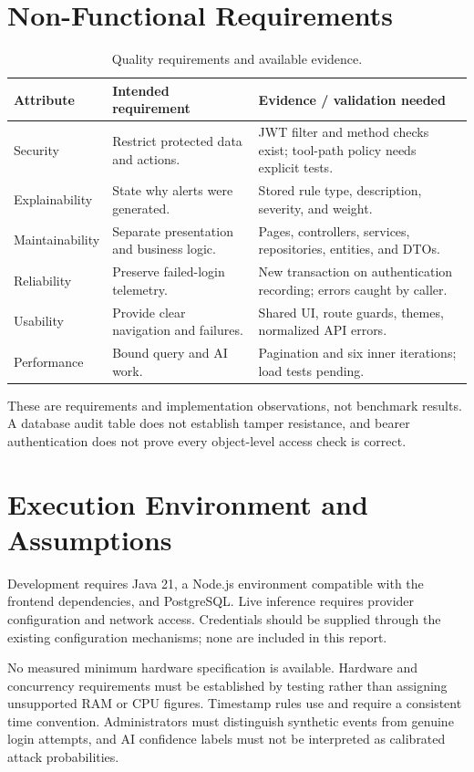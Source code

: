 \section{Non-Functional Requirements}
\begin{table}[htbp]\centering\small\caption{Quality requirements and available evidence.}
\begin{tabularx}{\textwidth}{lYY}\toprule Attribute & Intended requirement & Evidence / validation needed\\\midrule
Security & Restrict protected data and actions. & JWT filter and method checks exist; tool-path policy needs explicit tests.\\
Explainability & State why alerts were generated. & Stored rule type, description, severity, and weight.\\
Maintainability & Separate presentation and business logic. & Pages, controllers, services, repositories, entities, and DTOs.\\
Reliability & Preserve failed-login telemetry. & New transaction on authentication recording; errors caught by caller.\\
Usability & Provide clear navigation and failures. & Shared UI, route guards, themes, normalized API errors.\\
Performance & Bound query and AI work. & Pagination and six inner iterations; load tests pending.\\\bottomrule\end{tabularx}\end{table}

These are requirements and implementation observations, not benchmark results. A database audit table does not establish tamper resistance, and bearer authentication does not prove every object-level access check is correct.

\section{Execution Environment and Assumptions}
Development requires Java 21, a Node.js environment compatible with the frontend dependencies, and PostgreSQL. Live inference requires provider configuration and network access. Credentials should be supplied through the existing configuration mechanisms; none are included in this report.

No measured minimum hardware specification is available. Hardware and concurrency requirements must be established by testing rather than assigning unsupported RAM or CPU figures. Timestamp rules use  and require a consistent time convention. Administrators must distinguish synthetic events from genuine login attempts, and AI confidence labels must not be interpreted as calibrated attack probabilities.
